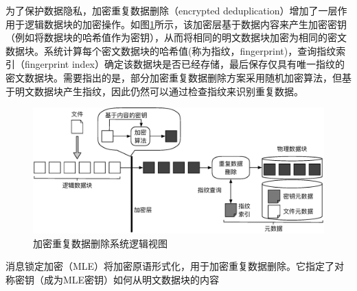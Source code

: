 为了保护数据隐私，加密重复数据删除（encrypted deduplication）增加了一层作用于逻辑数据块的加密操作。如图\ref{fig:加密重复数据删除系统逻辑视图}所示，该加密层基于数据内容来产生加密密钥（例如将数据块的哈希值作为密钥），从而将相同的明文数据块加密为相同的密文数据块。系统计算每个密文数据块的哈希值(称为指纹，fingerprint)，查询指纹索引（fingerprint index）确定该数据块是否已经存储，最后保存仅具有唯一指纹的密文数据块。需要指出的是，部分加密重复数据删除方案采用随机加密算法，但基于明文数据块产生指纹，因此仍然可以通过检查指纹来识别重复数据。

\begin{figure}[!htb]
    \small
    \centering
    \includegraphics[width=14cm]{pic/EncryptDedupSystemLogic.eps}
    \caption{加密重复数据删除系统逻辑视图}
    \label{fig:加密重复数据删除系统逻辑视图}
\end{figure}

消息锁定加密（MLE）将加密原语形式化，用于加密重复数据删除。它指定了对称密钥（成为MLE密钥）如何从明文数据块的内容





